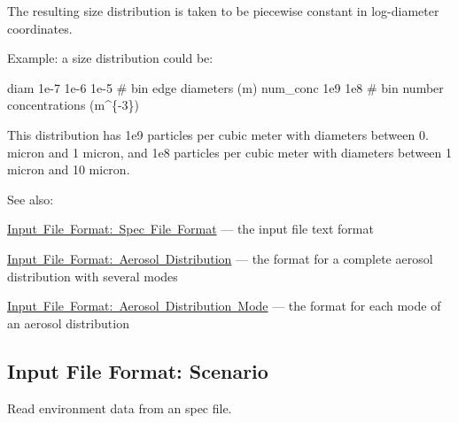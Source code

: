 The resulting size distribution is taken to be piecewise constant in log-\/diameter coordinates.

Example\+: a size distribution could be\+: 
\begin{DoxyPre}
 diam 1e-7 1e-6 1e-5  \# bin edge diameters (m)
 num\_conc 1e9 1e8     \# bin number concentrations (m^\{-3\})
 \end{DoxyPre}
 This distribution has 1e9 particles per cubic meter with diameters between 0. micron and 1 micron, and 1e8 particles per cubic meter with diameters between 1 micron and 10 micron.

See also\+:
\begin{DoxyItemize}
\item \mbox{\hyperlink{spec_file_format}{Input File Format\+: Spec File Format}} --- the input file text format
\item \mbox{\hyperlink{input_format_aero_dist}{Input File Format\+: Aerosol Distribution}} --- the format for a complete aerosol distribution with several modes
\item \mbox{\hyperlink{input_format_aero_mode}{Input File Format\+: Aerosol Distribution Mode}} --- the format for each mode of an aerosol distribution 
\end{DoxyItemize}\hypertarget{input_format_scenario}{}\subsection{Input File Format\+: Scenario}\label{input_format_scenario}
Read environment data from an spec file.


